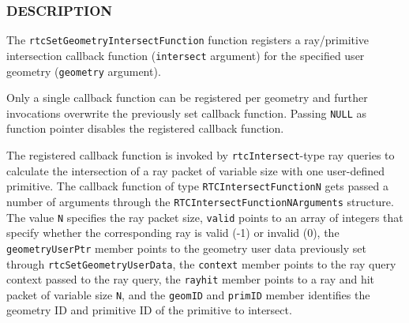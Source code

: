 \begin{Shaded}
\begin{Highlighting}[]

\OperatorTok{\{}
  \OperatorTok{*}\OperatorTok{;}
  \OperatorTok{*}\OperatorTok{;}
   \OperatorTok{;}
  \OperatorTok{*}\OperatorTok{;}
  \OperatorTok{*}\OperatorTok{;}
   \OperatorTok{;}
   \OperatorTok{;}
\OperatorTok{\};}

  \OperatorTok{(*}\OperatorTok{)(}
   \OperatorTok{*}
\OperatorTok{);}

\OperatorTok{(}
\OperatorTok{,}
\OperatorTok{);}
\end{Highlighting}
\end{Shaded}

\subsubsection{DESCRIPTION}\label{description}

The \texttt{rtcSetGeometryIntersectFunction} function registers a
ray/primitive intersection callback function (\texttt{intersect}
argument) for the specified user geometry (\texttt{geometry} argument).

Only a single callback function can be registered per geometry and
further invocations overwrite the previously set callback function.
Passing \texttt{NULL} as function pointer disables the registered
callback function.

The registered callback function is invoked by
\texttt{rtcIntersect}-type ray queries to calculate the intersection of
a ray packet of variable size with one user-defined primitive. The
callback function of type \texttt{RTCIntersectFunctionN} gets passed a
number of arguments through the \texttt{RTCIntersectFunctionNArguments}
structure. The value \texttt{N} specifies the ray packet size,
\texttt{valid} points to an array of integers that specify whether the
corresponding ray is valid (-1) or invalid (0), the
\texttt{geometryUserPtr} member points to the geometry user data
previously set through \texttt{rtcSetGeometryUserData}, the
\texttt{context} member points to the ray query context passed to the
ray query, the \texttt{rayhit} member points to a ray and hit packet of
variable size \texttt{N}, and the \texttt{geomID} and \texttt{primID}
member identifies the geometry ID and primitive ID of the primitive to
intersect.

